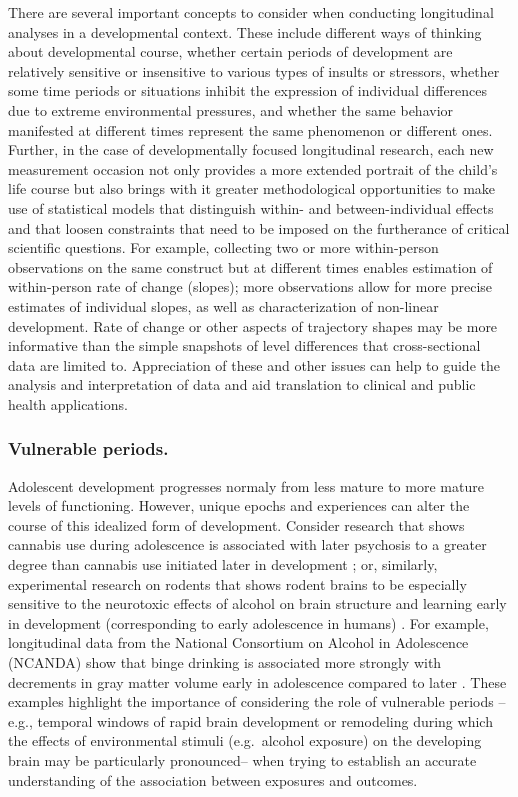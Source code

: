 \documentclass[
  number,
  preprint,
  3p,
  twocolumn]{elsarticle}
\begin{document}
There are several important concepts to consider when conducting
longitudinal analyses in a developmental context. These include
different ways of thinking about developmental course, whether certain
periods of development are relatively sensitive or insensitive to
various types of insults or stressors, whether some time periods or
situations inhibit the expression of individual differences due to
extreme environmental pressures, and whether the same behavior
manifested at different times represent the same phenomenon or different
ones. Further, in the case of developmentally focused longitudinal
research, each new measurement occasion not only provides a more
extended portrait of the child's life course but also brings with it
greater methodological opportunities to make use of statistical models
that distinguish within- and between-individual effects and that loosen
constraints that need to be imposed on the furtherance of critical
scientific questions. For example, collecting two or more within-person
observations on the same construct but at different times enables
estimation of within-person rate of change (slopes); more observations
allow for more precise estimates of individual slopes, as well as
characterization of non-linear development. Rate of change or other
aspects of trajectory shapes may be more informative than the simple
snapshots of level differences that cross-sectional data are limited to.
Appreciation of these and other issues can help to guide the analysis
and interpretation of data and aid translation to clinical and public
health applications.

\hypertarget{vulnerable-periods.}{%
\subsubsection{Vulnerable periods.}\label{vulnerable-periods.}}

Adolescent development progresses normaly from less mature to more
mature levels of functioning. However, unique epochs and experiences can
alter the course of this idealized form of development. Consider
research that shows cannabis use during adolescence is associated with
later psychosis to a greater degree than cannabis use initiated later in
development \citep{arseneault2002, bechtold2016, hasan2020, semple2005};
or, similarly, experimental research on rodents that shows rodent brains
to be especially sensitive to the neurotoxic effects of alcohol on brain
structure and learning early in development (corresponding to early
adolescence in humans) \citep{spear2016, crews2000, ji2018}. For
example, longitudinal data from the National Consortium on Alcohol in
Adolescence (NCANDA) show that binge drinking is associated more
strongly with decrements in gray matter volume early in adolescence
compared to later \citep{infante2022}. These examples highlight the
importance of considering the role of vulnerable periods -- e.g.,
temporal windows of rapid brain development or remodeling during which
the effects of environmental stimuli (e.g.~alcohol exposure) on the
developing brain may be particularly pronounced-- when trying to
establish an accurate understanding of the association between exposures
and outcomes.
\end{document}
